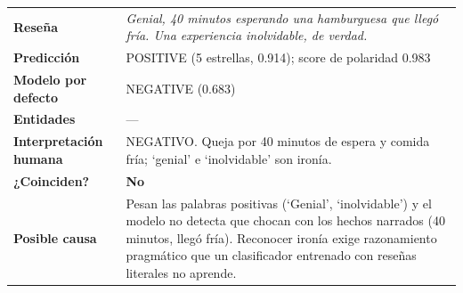\documentclass[12pt,a4paper]{article}
\begin{document}
\par\noindent\begin{minipage}{\linewidth}\centering\small\renewcommand{\arraystretch}{1.3}
\begin{tabular}{|>{\raggedright\arraybackslash}p{3.1cm}|>{\raggedright\arraybackslash}p{11.9cm}|}
\hline
\multicolumn{2}{|l|}{\textbf{\textcolor{azulUVG}{\#9 · Sarcasmo}}} \\ \hline
\textbf{Reseña} & \emph{Genial, 40 minutos esperando una hamburguesa que llegó fría. Una experiencia inolvidable, de verdad.} \\ \hline
\textbf{Predicción} & POSITIVE (5 estrellas, 0.914); score de polaridad 0.983 \\ \hline
\textbf{Modelo por defecto} & NEGATIVE (0.683) \\ \hline
\textbf{Entidades} & — \\ \hline
\textbf{Interpretación humana} & NEGATIVO. Queja por 40 minutos de espera y comida fría; `genial' e `inolvidable' son ironía. \\ \hline
\textbf{¿Coinciden?} & \textbf{\textcolor{red!70!black}{No}} \\ \hline
\textbf{Posible causa} & Pesan las palabras positivas (`Genial', `inolvidable') y el modelo no detecta que chocan con los hechos narrados (40 minutos, llegó fría). Reconocer ironía exige razonamiento pragmático que un clasificador entrenado con reseñas literales no aprende. \\ \hline
\end{tabular}
\end{minipage}\par\bigskip
\end{document}
